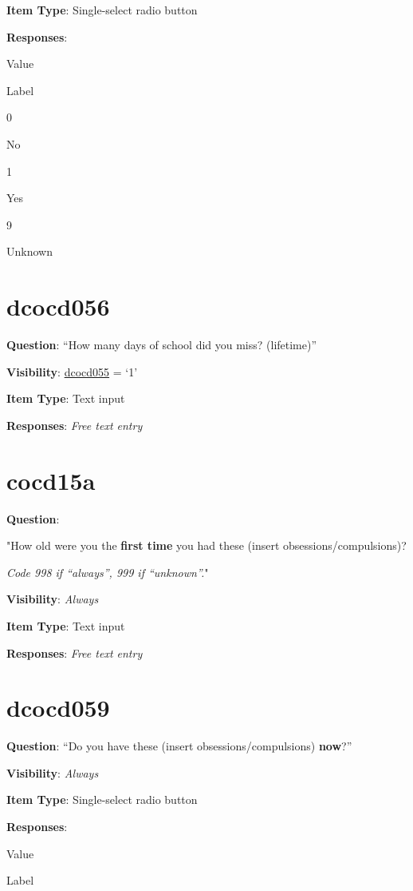 \documentclass[]{book}
\begin{document}
\textbf{Item Type}: Single-select radio button

\textbf{Responses}:

Value

Label

0

No

1

Yes

9

Unknown

\hypertarget{dcocd056}{%
\section{dcocd056}\label{dcocd056}}

\textbf{Question}: ``How many days of school did you miss? (lifetime)''

\textbf{Visibility}: \protect\hyperlink{dcocd055}{dcocd055} = `1'

\textbf{Item Type}: Text input

\textbf{Responses}: \emph{Free text entry}

\hypertarget{cocd15a}{%
\section{cocd15a}\label{cocd15a}}

\textbf{Question}:

"How old were you the \textbf{first time} you had these (insert obsessions/compulsions)?

\emph{Code 998 if ``always'', 999 if ``unknown''.}"

\textbf{Visibility}: \emph{Always}

\textbf{Item Type}: Text input

\textbf{Responses}: \emph{Free text entry}

\hypertarget{dcocd059}{%
\section{dcocd059}\label{dcocd059}}

\textbf{Question}: ``Do you have these (insert obsessions/compulsions) \textbf{now}?''

\textbf{Visibility}: \emph{Always}

\textbf{Item Type}: Single-select radio button

\textbf{Responses}:

Value

Label
\end{document}
